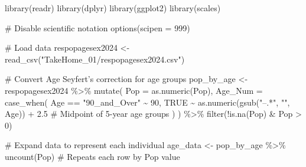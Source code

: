 \documentclass[
  letterpaper,
  DIV=11,
  numbers=noendperiod]{scrartcl}
\newenvironment{Shaded}{\begin{snugshade}}{\end{snugshade}}
\newcommand{\AttributeTok}[1]{\textcolor[rgb]{0.40,0.45,0.13}{#1}}
\newcommand{\CommentTok}[1]{\textcolor[rgb]{0.37,0.37,0.37}{#1}}
\newcommand{\ConstantTok}[1]{\textcolor[rgb]{0.56,0.35,0.01}{#1}}
\newcommand{\DecValTok}[1]{\textcolor[rgb]{0.68,0.00,0.00}{#1}}
\newcommand{\FloatTok}[1]{\textcolor[rgb]{0.68,0.00,0.00}{#1}}
\newcommand{\FunctionTok}[1]{\textcolor[rgb]{0.28,0.35,0.67}{#1}}
\newcommand{\NormalTok}[1]{\textcolor[rgb]{0.00,0.23,0.31}{#1}}
\newcommand{\OtherTok}[1]{\textcolor[rgb]{0.00,0.23,0.31}{#1}}
\newcommand{\SpecialCharTok}[1]{\textcolor[rgb]{0.37,0.37,0.37}{#1}}
\newcommand{\StringTok}[1]{\textcolor[rgb]{0.13,0.47,0.30}{#1}}
\begin{document}
\begin{Shaded}
\begin{Highlighting}[]
\FunctionTok{library}\NormalTok{(readr)}
\FunctionTok{library}\NormalTok{(dplyr)}
\FunctionTok{library}\NormalTok{(ggplot2)}
\FunctionTok{library}\NormalTok{(scales)}

\CommentTok{\# Disable scientific notation}
\FunctionTok{options}\NormalTok{(}\AttributeTok{scipen =} \DecValTok{999}\NormalTok{)}

\CommentTok{\# Load data}
\NormalTok{respopagesex2024 }\OtherTok{\textless{}{-}} \FunctionTok{read\_csv}\NormalTok{(}\StringTok{"TakeHome\_01/respopagesex2024.csv"}\NormalTok{)}

\CommentTok{\# Convert Age Seyfert’s correction for age groups}
\NormalTok{pop\_by\_age }\OtherTok{\textless{}{-}}\NormalTok{ respopagesex2024 }\SpecialCharTok{\%\textgreater{}\%}
  \FunctionTok{mutate}\NormalTok{(}
    \AttributeTok{Pop =} \FunctionTok{as.numeric}\NormalTok{(Pop),}
    \AttributeTok{Age\_Num =} \FunctionTok{case\_when}\NormalTok{(}
\NormalTok{      Age }\SpecialCharTok{==} \StringTok{"90\_and\_Over"} \SpecialCharTok{\textasciitilde{}} \DecValTok{90}\NormalTok{,}
      \ConstantTok{TRUE} \SpecialCharTok{\textasciitilde{}} \FunctionTok{as.numeric}\NormalTok{(}\FunctionTok{gsub}\NormalTok{(}\StringTok{"–.*"}\NormalTok{, }\StringTok{""}\NormalTok{, Age)) }\SpecialCharTok{+} \FloatTok{2.5}  \CommentTok{\# Midpoint of 5{-}year age groups}
\NormalTok{    )}
\NormalTok{  ) }\SpecialCharTok{\%\textgreater{}\%}
  \FunctionTok{filter}\NormalTok{(}\SpecialCharTok{!}\FunctionTok{is.na}\NormalTok{(Pop) }\SpecialCharTok{\&}\NormalTok{ Pop }\SpecialCharTok{\textgreater{}} \DecValTok{0}\NormalTok{)}

\CommentTok{\# Expand data to represent each individual}
\NormalTok{age\_data }\OtherTok{\textless{}{-}}\NormalTok{ pop\_by\_age }\SpecialCharTok{\%\textgreater{}\%}
  \FunctionTok{uncount}\NormalTok{(Pop)  }\CommentTok{\# Repeats each row by Pop value}


\end{Highlighting}
\end{Shaded}
\end{document}
